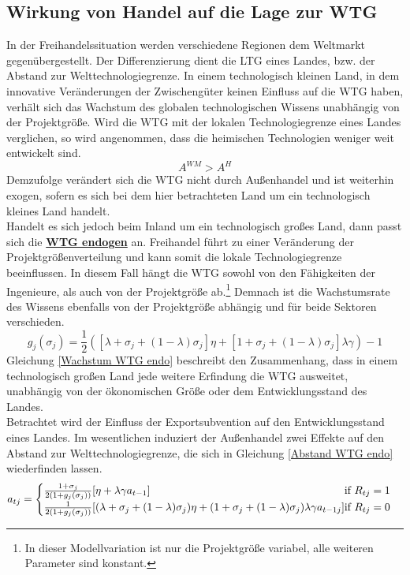 \subsection{Wirkung von Handel auf die Lage zur WTG}\label{sec:Wirkung von Handel auf die Lage zur Welttechnologiegrenze} \label{Efekkte}
%
In der Freihandelssituation werden verschiedene Regionen dem Weltmarkt gegenübergestellt. Der Differenzierung dient die LTG eines Landes, bzw. der Abstand zur Welttechnologiegrenze. In einem technologisch kleinen Land, in dem innovative Veränderungen der Zwischengüter keinen Einfluss auf die WTG haben, verhält sich das Wachstum des globalen technologischen Wissens unabhängig von der Projektgröße. Wird die WTG mit der lokalen Technologiegrenze eines Landes verglichen, so wird angenommen, dass die heimischen Technologien weniger weit entwickelt sind. 
%
	\begin{equation}
		A^{WM}>A^H
	\end{equation}
%	
Demzufolge verändert sich die WTG nicht durch Außenhandel und ist weiterhin exogen, sofern es sich bei dem hier betrachteten Land um ein technologisch kleines Land handelt.\\ 
Handelt es sich jedoch beim Inland um ein technologisch großes Land, dann passt sich die \textbf{\uline{WTG endogen}} an.  Freihandel führt zu einer Veränderung der Projektgrößenverteilung und kann somit die lokale Technologiegrenze beeinflussen.   
In diesem Fall hängt die WTG sowohl von den Fähigkeiten der Ingenieure, als auch von der Projektgröße ab.\footnote{In dieser Modellvariation ist nur die Projektgröße variabel, alle weiteren Parameter sind konstant.} Demnach ist die Wachstumsrate des Wissens ebenfalls von der Projektgröße abhängig und für beide Sektoren verschieden. 
%
	\begin{equation}
		g_j(\sigma_j)=\frac{1}{2}\left([\lambda+\sigma_j+(1-\lambda)\sigma_j]\eta+[1+\sigma_j+(1-\lambda)\sigma_j]\lambda\gamma\right)-1\label{Wachstum WTG endo}
	\end{equation}
%
Gleichung \eqref{Wachstum WTG endo} beschreibt den Zusammenhang, dass in einem technologisch großen Land jede weitere Erfindung die WTG ausweitet, unabhängig von der ökonomischen Größe oder dem Entwicklungsstand des Landes.\\
Betrachtet wird der Einfluss der Exportsubvention auf den Entwicklungsstand eines Landes. Im wesentlichen induziert der Außenhandel zwei Effekte auf den Abstand zur Welttechnologiegrenze, die sich in Gleichung \eqref{Abstand WTG endo} wiederfinden lassen.  
%
	\begin{equation}
		a_{tj}=\begin{cases}\frac{1+\sigma_j}{2(1+g_j(\sigma_j))}[\eta+\lambda \gamma a_{t-1}] \hfill\text{if  } R_{tj}=1 \\
		\frac{1}{2(1+g_j(\sigma_j))}[(\lambda+\sigma_j+(1-\lambda)\sigma_j)\eta+(1+\sigma_j+(1-\lambda)\sigma_j)\lambda\gamma a_{t-1 j}] \hfill\text{if   }R_{tj}=0
		\end{cases}\label{Abstand WTG endo}
	\end{equation}
